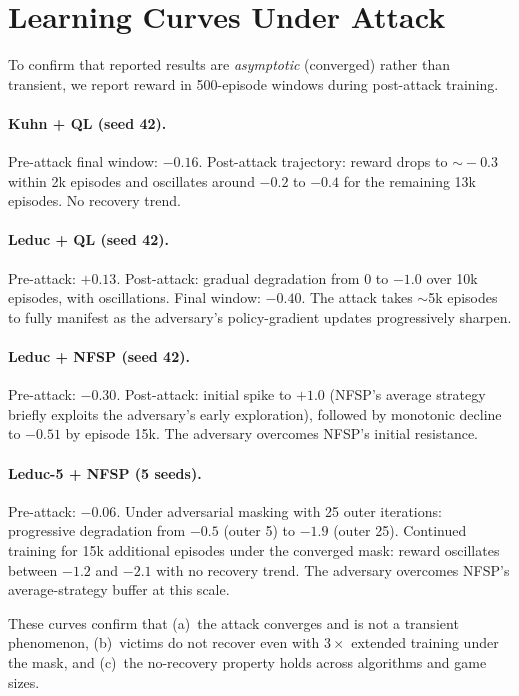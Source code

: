 \documentclass{article}
\begin{document}
\section{Learning Curves Under Attack}
\label{app:curves}

To confirm that reported results are \emph{asymptotic} (converged) rather than transient, we report reward in 500-episode windows during post-attack training.

\paragraph{Kuhn + QL (seed 42).}
Pre-attack final window: $-0.16$. Post-attack trajectory: reward drops to $\sim\!-0.3$ within 2k episodes and oscillates around $-0.2$ to $-0.4$ for the remaining 13k episodes. No recovery trend.

\paragraph{Leduc + QL (seed 42).}
Pre-attack: $+0.13$. Post-attack: gradual degradation from $0$ to $-1.0$ over 10k episodes, with oscillations. Final window: $-0.40$. The attack takes $\sim$5k episodes to fully manifest as the adversary's policy-gradient updates progressively sharpen.

\paragraph{Leduc + NFSP (seed 42).}
Pre-attack: $-0.30$. Post-attack: initial spike to $+1.0$ (NFSP's average strategy briefly exploits the adversary's early exploration), followed by monotonic decline to $-0.51$ by episode 15k. The adversary overcomes NFSP's initial resistance.

\paragraph{Leduc-5 + NFSP (5 seeds).}
Pre-attack: $-0.06$. Under adversarial masking with 25 outer iterations: progressive degradation from $-0.5$ (outer 5) to $-1.9$ (outer 25). Continued training for 15k additional episodes under the converged mask: reward oscillates between $-1.2$ and $-2.1$ with no recovery trend. The adversary overcomes NFSP's average-strategy buffer at this scale.

These curves confirm that (a)~the attack converges and is not a transient phenomenon, (b)~victims do not recover even with $3\times$ extended training under the mask, and (c)~the no-recovery property holds across algorithms and game sizes.
\end{document}
